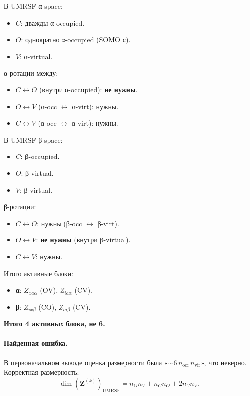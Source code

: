 \documentclass[11pt, a4paper]{article}
\theoremstyle{definition}
\newcommand{\nocc}{n_{\text{occ}}}
\newcommand{\nvir}{n_{\text{vir}}}
\begin{document}
В UMRSF α-space:
\begin{itemize}
    \item $C$: дважды α-occupied.
    \item $O$: однократно α-occupied (SOMO α).
    \item $V$: α-virtual.
\end{itemize}

α-ротации между:
\begin{itemize}
    \item $C \leftrightarrow O$ (внутри α-occupied): \textbf{не нужны}.
    \item $O \leftrightarrow V$ (α-occ $\leftrightarrow$ α-virt): нужны.
    \item $C \leftrightarrow V$ (α-occ $\leftrightarrow$ α-virt): нужны.
\end{itemize}

В UMRSF β-space:
\begin{itemize}
    \item $C$: β-occupied.
    \item $O$: β-virtual.
    \item $V$: β-virtual.
\end{itemize}

β-ротации:
\begin{itemize}
    \item $C \leftrightarrow O$: нужны (β-occ $\leftrightarrow$ β-virt).
    \item $O \leftrightarrow V$: \textbf{не нужны} (внутри β-virtual).
    \item $C \leftrightarrow V$: нужны.
\end{itemize}

Итого активные блоки:
\begin{itemize}
    \item \textbf{α}: $Z_{xa\alpha}$ (OV), $Z_{ia\alpha}$ (CV).
    \item \textbf{β}: $Z_{ix\beta}$ (CO), $Z_{ia\beta}$ (CV).
\end{itemize}

\textbf{Итого 4 активных блока, не 6.}

\paragraph{Найденная ошибка.} В первоначальном выводе оценка размерности была «$\sim 6\, \nocc\, \nvir$», что неверно. Корректная размерность:
$$
\dim(\mathbf Z^{(k)})_{\text{UMRSF}} = n_O n_V + n_C n_O + 2 n_C n_V.
$$
\end{document}
